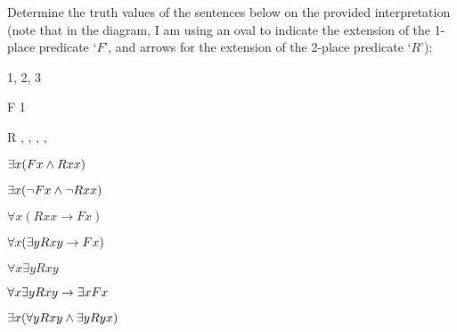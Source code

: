 \problempart Determine the truth values of the sentences below on the provided interpretation (note that in the diagram, I am using an oval to indicate the extension of the 1-place predicate `$F$', and arrows for the extension of the 2-place predicate `$R$'):\\


\begin{minipage}{\textwidth}
\begin{multicols}{2}

	\begin{ekey}
		\item[\text{Domain}] 1, 2, 3
		\item[F] 1
		\item[R] , , ,   , 
		
	\end{ekey}

\columnbreak
	
\end{multicols}
\end{minipage}




\begin{earg}

\item $\exists x(Fx \wedge Rxx)$
\item $\exists x(\neg Fx \wedge \neg Rxx)$
\item $\forall x(Rxx \rightarrow Fx)$
\item $\forall x(\exists yRxy \rightarrow Fx)$
\item $\forall x\exists y Rxy$
\item $\forall x\exists yRxy \rightarrow \exists xFx$
\item $\exists x(\forall y Rxy \wedge \exists yRyx)$

\end{earg}




